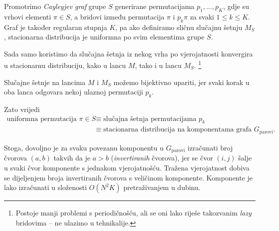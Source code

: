 Promotrimo \emph{Cayleyjev graf} grupe $S$ generirane permutacijama 
$p_1, \ldots, p_K$, gdje su vrhovi elementi $\pi \in S$, a bridovi
između permutacija $\pi$ i $p_k \pi$ za svaki $1 \le k \le K$.
Graf je također regularan stupnja $K$, pa ako definiramo sličnu slučajnu
šetnju $M_S$, stacionarna distribucija je uniformna po svim elementima
grupe $S$.

Sada samo koristimo da slučajna šetnja iz nekog vrha po vjerojatnosti
konvergira u stacionarnu distribuciju, kako u lancu $M$, tako i u
lancu $M_S$.
\footnote{Postoje manji problemi s periodičnošću, ali se oni lako riješe 
takozvanim \textit{lazy} bridovima -- ne ulazimo u tehnikalije.}

Slučajne šetnje na lancima $M$ i $M_S$ možemo bijektivno upariti, jer svaki
korak u oba lanca odgovara nekoj ulaznoj permutaciji $p_k$.

Zato vrijedi
\begin{align*}
  \text{uniformna permutacija } \pi \in S 
  &\equiv \text{slučajna šetnja permutacijama } p_k \\
  &\equiv \text{stacionarna distribucija na komponentama grafa }
  G_\text{parovi}.
\end{align*}

Stoga, dovoljno je za svaku povezanu komponentu u $G_\text{parovi}$ 
izračunati broj čvorova $(a, b)$ takvih da je $a > b$ (\textit{invertiranih}
čvorova),
jer se čvor $(i, j)$ šalje u svaki čvor komponente s jednakom vjerojatnošću.
Tražena vjerojatnost dobiva se dijeljenjem broja invertiranih čvorova
s veličinom komponente.
Komponente je lako izračunati u složenosti $O(N^2 K)$ pretraživanjem u dubinu.


